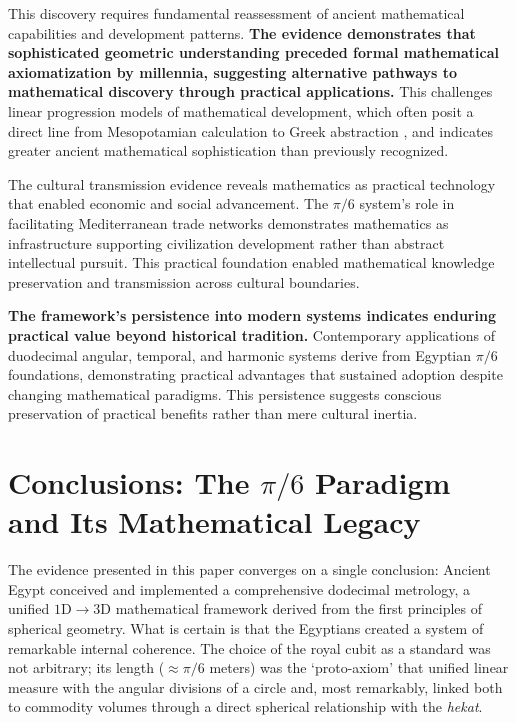 \documentclass[11pt]{article}
\begin{document}
This discovery requires fundamental reassessment of ancient mathematical capabilities and development patterns. \textbf{The evidence demonstrates that sophisticated geometric understanding preceded formal mathematical axiomatization by millennia, suggesting alternative pathways to mathematical discovery through practical applications.} This challenges linear progression models of mathematical development, which often posit a direct line from Mesopotamian calculation to Greek abstraction \cite{neugebauer1969exact}, and indicates greater ancient mathematical sophistication than previously recognized.

The cultural transmission evidence reveals mathematics as practical technology that enabled economic and social advancement. The $\pi/6$ system's role in facilitating Mediterranean trade networks demonstrates mathematics as infrastructure supporting civilization development rather than abstract intellectual pursuit. This practical foundation enabled mathematical knowledge preservation and transmission across cultural boundaries.

\textbf{The framework's persistence into modern systems indicates enduring practical value beyond historical tradition.} Contemporary applications of duodecimal angular, temporal, and harmonic systems derive from Egyptian $\pi/6$ foundations, demonstrating practical advantages that sustained adoption despite changing mathematical paradigms. This persistence suggests conscious preservation of practical benefits rather than mere cultural inertia.

\section{Conclusions: The \texorpdfstring{$\pi/6$}{pi/6} Paradigm and Its Mathematical Legacy}

The evidence presented in this paper converges on a single conclusion: Ancient Egypt conceived and implemented a comprehensive dodecimal metrology, a unified $1\text{D} \to 3\text{D}$ mathematical framework derived from the first principles of spherical geometry. What is certain is that the Egyptians created a system of remarkable internal coherence. The choice of the royal cubit as a standard was not arbitrary; its length ($\approx\pi/6$ meters) was the `proto-axiom' that unified linear measure with the angular divisions of a circle and, most remarkably, linked both to commodity volumes through a direct spherical relationship with the \textit{hekat}. 
\end{document}
